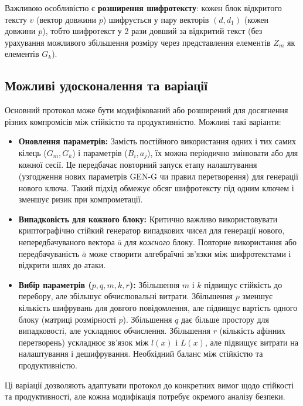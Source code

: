 Важливою особливістю є \textbf{розширення шифротексту}: кожен блок відкритого тексту $v$ (вектор довжини $p$) шифрується у пару векторів $(d, d_1)$ (кожен довжини $p$), тобто шифротекст у 2 рази довший за відкритий текст (без урахування можливого збільшення розміру через представлення елементів $Z_m$ як елементів $G_k$).

\subsection{Можливі удосконалення та варіації}
\label{subsec:protocol_variations}
Основний протокол може бути модифікований або розширений для досягнення різних компромісів між стійкістю та продуктивністю.
Можливі такі варіанти:

\begin{itemize}
    \item \textbf{Оновлення параметрів:} Замість постійного використання одних і тих самих кілець ($G_m, G_k$) і параметрів ($B_i, a_j$), їх можна періодично змінювати або для кожної сесії. Це передбачає повторний запуск етапу налаштування (узгодження нових параметрів GEN-G чи правил перетворення) для генерації нового ключа. Такий підхід обмежує обсяг шифротексту під одним ключем і зменшує ризик при компрометації.
    \item \textbf{Випадковість для кожного блоку:} Критично важливо використовувати криптографічно стійкий генератор випадкових чисел для генерації нового, непередбачуваного вектора $\bar{a}$ для \emph{кожного} блоку. Повторне використання або передбачуваність $\bar{a}$ може створити алгебраїчні зв'язки між шифротекстами і відкрити шлях до атаки.
    \item \textbf{Вибір параметрів ($p, q, m, k, r$):} Збільшення $m$ і $k$ підвищує стійкість до перебору, але збільшує обчислювальні витрати. Збільшення $p$ зменшує кількість шифрувань для довгого повідомлення, але підвищує вартість одного блоку (матриці розмірності $p$). Збільшення $q$ дає більше простору для випадковості, але ускладнює обчислення. Збільшення $r$ (кількість афінних перетворень) ускладнює зв'язок між $l(x)$ і $L(x)$, але підвищує витрати на налаштування і дешифрування. Необхідний баланс між стійкістю та продуктивністю.
\end{itemize}
Ці варіації дозволяють адаптувати протокол до конкретних вимог щодо стійкості та продуктивності, але кожна модифікація потребує окремого аналізу безпеки.

